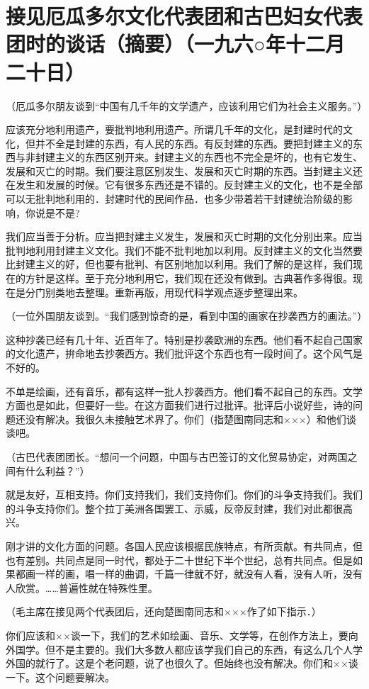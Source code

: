 \section[接见厄瓜多尔文化代表团和古巴妇女代表团时的谈话（摘要）（一九六○年十二月二十日）]{接见厄瓜多尔文化代表团和古巴妇女代表团时的谈话（摘要）（一九六○年十二月二十日）}


（厄瓜多尔朋友谈到“中国有几千年的文学遗产，应该利用它们为社会主义服务。”）

应该充分地利用遗产，要批判地利用遗产。所谓几千年的文化，是封建时代的文化，但并不全是封建的东西，有人民的东西。有反封建的东西。要把封建主义的东西与非封建主义的东西区别开来。封建主义的东西也不完全是坏的，也有它发生、发展和灭亡的时期。我们要注意区别发生、发展和灭亡时期的东西。当封建主义还在发生和发展的时候。它有很多东西还是不错的。反封建主义的文化，也不是全部可以无批判地利用的．封建时代的民间作品．也多少带着若干封建统治阶级的影响，你说是不是?

我们应当善于分析。应当把封建主义发生，发展和灭亡时期的文化分别出来。应当批判地利用封建主义文化。我们不能不批判地加以利用。反封建主义的文化当然要比封建主义的好，但也要有批判、有区别地加以利用。我们了解的是这样，我们现在的方针是这样。至于充分地利用它，我们现在还没有做到。古典著作多得很。现在是分门别类地去整理。重新再版，用现代科学观点逐步整理出来。

（一位外国朋友谈到。“我们感到惊奇的是，看到中国的画家在抄袭西方的画法。”）

这种抄袭已经有几十年、近百年了。特别是抄袭欧洲的东西。他们看不起自己国家的文化遗产，拚命地去抄袭西方。我们批评这个东西也有一段时间了。这个风气是不好的。

不单是绘画，还有音乐，都有这样一批人抄袭西方。他们看不起自己的东西。文学方面也是如此，但要好一些。在这方面我们进行过批评。批评后小说好些，诗的问题还没有解决。我很久未接触艺术界了。你们（指楚图南同志和×××）和他们谈谈吧。

（古巴代表团团长。“想问一个问题，中国与古巴签订的文化贸易协定，对两国之间有什么利益？”）

就是友好，互相支持。你们支持我们，我们支持你们。你们的斗争支持我们。我们的斗争支持你们。整个拉丁美洲各国罢工、示威，反帝反封建，我们对此都很高兴。

刚才讲的文化方面的问题。各国人民应该根据民族特点，有所贡献。有共同点，但也有差别。共同点是同一时代，都处于二十世纪下半个世纪，总有共同点。但是如果都画一样的画，唱一样的曲调，千篇一律就不好，就没有人看，没有人听，没有人欣赏。……普遍性就在特殊性里。

（毛主席在接见两个代表团后，还向楚图南同志和×××作了如下指示．）

你们应该和××谈一下，我们的艺术如绘画、音乐、文学等，在创作方法上，要向外国学。但不是主要的。我们大多数人都应该学我们自己的东西，有这么几个人学外国的就行了。这是个老问题，说了也很久了。但始终也没有解决。你们和××谈一下。这个问题要解决。


